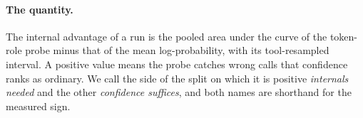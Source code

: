 \paragraph{The quantity.}
The internal advantage of a run is the pooled area under the curve of the token-role probe minus that of the mean log-probability, with its tool-resampled interval. A positive value means the probe catches wrong calls that confidence ranks as ordinary. We call the side of the split on which it is positive \emph{internals needed} and the other \emph{confidence suffices}, and both names are shorthand for the measured sign.
